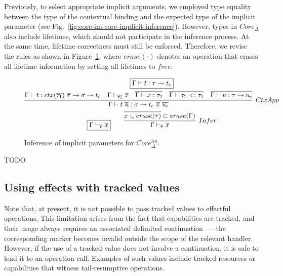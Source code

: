\documentclass[acmsmall,review,screen]{acmart}
\newcommand{\mathframebox}[1]{\framebox{$\displaystyle #1$}}
\newcommand{\ap}{~}
\newcommand{\ctx}[1]{ctx(#1)~}
\newcommand{\step}{\rightsquigarrow}
\begin{document}
Previously, to select appropriate implicit arguments, we employed type equality between the type of the contextual binding and the expected type of the implicit parameter (see Fig.\ \ref{fig:core-im-core-implicit-inference}).
However, types in $Core_\Delta$ also include lifetimes, which should not participate in the inference process.
At the same time, lifetime correctness must still be enforced.
Therefore, we revise the rules as shown in Figure~\ref{fig:core-im-delta-core-implicit-inference}, where $erase(\cdot)$ denotes an operation that erases all lifetime information by setting all lifetimes to $free$.

\begin{figure}
    \begin{gather*}
        \mathframebox{\Gamma\vdash t : \tau \step t_{c}} \\
        \infer[CtxApp]{
            \Gamma\vdash t\ap\overline{u} : \sigma \step t_{c} \ap \overline{x}\ap\overline{u_{c}}
        }{
            \Gamma\vdash t : \ctx{\overline{\tau_1}} \overline{\tau} \to \sigma \step t_{c} &
            \Gamma\vdash_{\overline{\tau_1}}\overline{x} &
            \overline{\Gamma\vdash x : \tau_2} &
            \overline{\Gamma\vdash \tau_2 <: \tau_1} &
            \overline{\Gamma\vdash u : \tau \step u_{c}}
        } \\
        \mathframebox{\Gamma\vdash_{\overline{\tau}} \overline{x}}
        \text{\hspace{2em}}
        \infer[Infer]{\Gamma\vdash_{\overline{\tau}} \overline{x}}{\overline{x :_c erase(\tau)}\subset erase(\Gamma)}
    \end{gather*}
    \caption{Inference of implicit parameters for $Core_\Delta^{im}$.}
    \label{fig:core-im-delta-core-implicit-inference}
\end{figure}



TODO %


\subsection{Using effects with tracked values}

Note that, at present, it is not possible to pass tracked values to effectful operations.
This limitation arises from the fact that capabilities are tracked, and their usage always requires an associated delimited continuation~--- the corresponding marker becomes invalid outside the scope of the relevant handler.
However, if the use of a tracked value does not involve a continuation, it is safe to lend it to an operation call.
Examples of such values include tracked resources or capabilities that witness tail-resumptive operations. %
\end{document}
